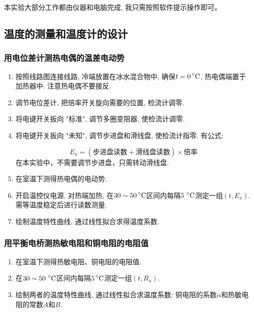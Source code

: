 \documentclass[11pt]{article}
\newcommand*{\unit}[1]{\mathop{}\!\mathrm{#1}}
\newcommand*{\mcelsius}{\unit{\prescript{\circ}{}C}}
\begin{document}
本实验大部分工作都由仪器和电脑完成, 我只需按照软件提示操作即可。

\subsection{温度的测量和温度计的设计}

\subsubsection{用电位差计测热电偶的温差电动势}

\begin{enumerate}
    
  \item 按照线路图连接线路, 冷端放置在冰水混合物中, 确保$t=0 \mcelsius$, 热电偶端置于加热器中. 注意热电偶不要接反.
  
  \item 调节电位差计, 把倍率开关旋向需要的位置, 检流计调零.
  
  \item 将电键开关扳向 "标准", 调节多圈变阻器, 使检流计调零.
  
  \item 将电键开关扳向 "未知", 调节步进盘和滑线盘, 使检流计指零. 有公式:
  
  \[
      E_{\mathrm{x}} = (\text{步进盘读数}+\text{滑线盘读数})\times\text{倍率}
  \]
  在本实验中，不需要调节步进盘，只需转动滑线盘.
  
  \item 在室温下测得热电偶的电动势.
  
  \item 开启温控仪电源, 对热端加热, 在$ 30\sim 50\mcelsius $区间内每隔$5\,\mcelsius $测定一组$ (t,E_x)$. 需等温度稳定后进行读数测量. 

  \item 绘制温度特性曲线, 通过线性拟合求得温度系数. 

\end{enumerate}

\subsubsection{用平衡电桥测热敏电阻和铜电阻的电阻值}

\begin{enumerate}
    
    \item 在室温下测得热敏电阻、铜电阻的电阻值. 

    \item 在$ 30\sim 50\,\mcelsius $区间内每隔$ 5\mcelsius $测定一组$ (t,R_x) $. 

    \item 绘制两者的温度特性曲线, 通过线性拟合求温度系数: 铜电阻的系数$\alpha$和热敏电阻的常数$A$和$B$. 

\end{enumerate}
\end{document}

